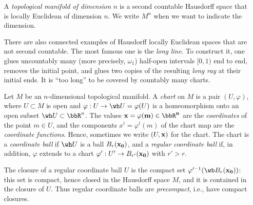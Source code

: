 \begin{defn}
    A \emph{topological manifold of dimension $n$} is a second countable Hausdorff space that is locally Euclidean of dimension $n$. We write $M^n$ when we want to indicate the dimension.
\end{defn}

\begin{rem*}
    There are also connected examples of Hausdorff locally Euclidean spaces that are not second countable. The most famous one is the \emph{long line}. To construct it, one glues uncountably many (more precisely, $\omega_1$) half-open intervals $[0,1)$ end to end, removes the initial point, and glues two copies of the resulting \emph{long ray} at their initial ends. It is ``too long'' to be covered by countably many charts.
\end{rem*}

\begin{defn}[Charts]
    Let $M$ be an $n$-dimensional topological manifold. A \emph{chart} on $M$ is a pair $(U,\varphi)$, where $U\subset M$ is open and $\varphi:U\to\wh U=\varphi(U)$ is a homeomorphism onto an open subset $\wh U\subset\bbR^n$. The values $\bf{x}=\varphi(m)\in\bbR^n$ are the \emph{coordinates} of the point $m\in U$, and the components $x^i=\varphi^i(m)$ of the chart map are the \emph{coordinate functions}. Hence, sometimes we write $(U,\bf{x})$ for the chart. The chart is a \emph{coordinate ball} if $\wh U$ is a ball $B_r(\bf{x}_0)$, and a \emph{regular coordinate ball} if, in addition, $\varphi$ extends to a chart $\varphi':U'\to B_{r'}(\bf{x}_0)$ with $r'>r$.
\end{defn}
The closure of a regular coordinate ball $U$ is the compact set $\varphi'^{-1}(\wb B_r(\bf{x}_0))$: this set is compact, hence closed in the Hausdorff space $M$, and it is contained in the closure of $U$. Thus regular coordinate balls are \emph{precompact}, i.e., have compact closures.

